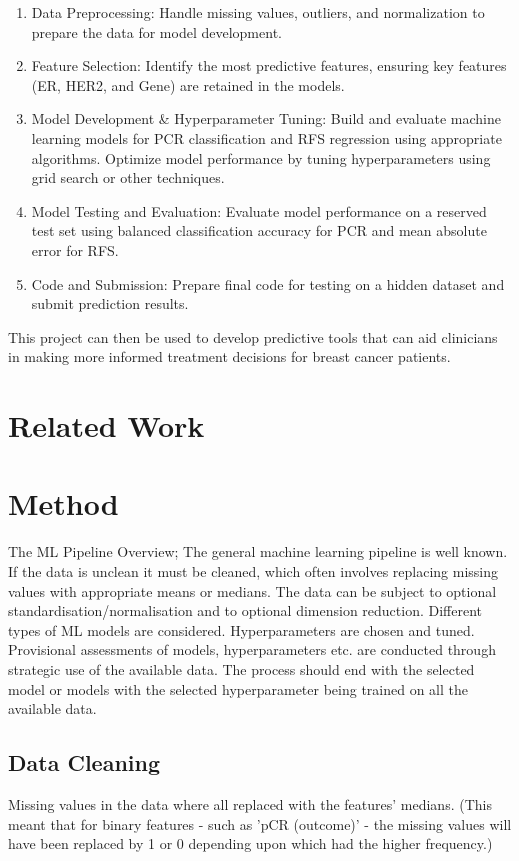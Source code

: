 \documentclass{article}
\begin{document}
\begin{enumerate}
  \item Data Preprocessing: Handle missing values, outliers, and normalization to prepare the data for model development.
  \item Feature Selection: Identify the most predictive features, ensuring key features (ER, HER2, and Gene) are retained in the models.
  \item Model Development \& Hyperparameter Tuning: Build and evaluate machine learning models for PCR classification and RFS regression using appropriate algorithms. Optimize model performance by tuning hyperparameters using grid search or other techniques.
  \item Model Testing and Evaluation: Evaluate model performance on a reserved test set using balanced classification accuracy for PCR and mean absolute error for RFS.
  \item Code and Submission: Prepare final code for testing on a hidden dataset and submit prediction results.
\end{enumerate}

This project can then be used to develop predictive tools that can aid clinicians in making more informed treatment decisions for breast cancer patients.

\section{Related Work}


\section{Method}

The ML Pipeline Overview; The general machine learning pipeline is well known. If the data is unclean it must be cleaned, which often involves replacing missing values with appropriate means or medians. The data can be subject to optional standardisation/normalisation and to optional dimension reduction.  Different types of ML models are considered. Hyperparameters are chosen and tuned. Provisional assessments of models, hyperparameters etc. are conducted through strategic use of the available data. The process should end with the selected model or models with the selected hyperparameter being trained on all the available data. 

\subsection{Data Cleaning}
Missing values in the data where all replaced with the features' medians. (This meant that for binary features - such as 'pCR (outcome)' - the missing values will have been replaced by 1 or 0 depending upon which had the higher frequency.)  
\end{document}
